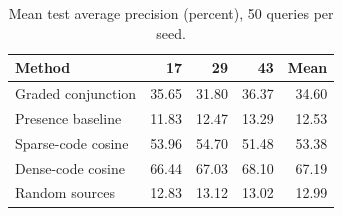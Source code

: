\begin{table}[tbp]
    \centering
    \small
    \caption{Mean test average precision (percent), 50 queries per seed.}
    \label{tab:retrieval}
    \begin{tabular}{lrrrr}
        \toprule
        Method             & 17    & 29    & 43    & Mean  \\
        \midrule
        Graded conjunction & 35.65 & 31.80 & 36.37 & 34.60 \\
        Presence baseline  & 11.83 & 12.47 & 13.29 & 12.53 \\
        Sparse-code cosine & 53.96 & 54.70 & 51.48 & 53.38 \\
        Dense-code cosine  & 66.44 & 67.03 & 68.10 & 67.19 \\
        Random sources     & 12.83 & 13.12 & 13.02 & 12.99 \\
        \bottomrule
    \end{tabular}
\end{table}

